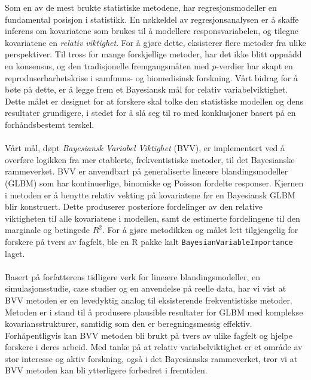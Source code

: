 Som en av de mest brukte statistiske metodene, har regresjonsmodeller en fundamental posisjon i statistikk. En nøkkeldel av regresjonsanalysen er å skaffe inferens om kovariatene som brukes til å modellere responsvariabelen, og tilegne kovariatene en \textit{relativ viktighet}. For å gjøre dette, eksisterer flere metoder fra ulike perspektiver. Til tross for mange forskjellige metoder, har det ikke blitt oppnådd en konsensus, og den tradisjonelle fremgangsmåten med $p$-verdier har skapt en reproduserbarhetskrise i samfunns- og biomedisinsk forskning. Vårt bidrag for å bøte på dette, er å legge frem et Bayesiansk mål for relativ variabelviktighet. Dette målet er designet for at forskere skal tolke den statistiske modellen og dens resultater grundigere, i stedet for å slå seg til ro med konklusjoner basert på en forhåndsbestemt terskel.
\\
\\
Vårt mål, døpt \textit{Bayesiansk Variabel Viktighet} (BVV), er implementert ved å overføre logikken fra mer etablerte, frekventistiske metoder, til det Bayesianske rammeverket. BVV er anvendbart på generaliserte lineære blandingsmodeller (GLBM) som har kontinuerlige, binomiske og Poisson fordelte responser. Kjernen i metoden er å benytte relativ vekting på kovariatene før en Bayesiansk GLBM blir konstruert. Dette produserer posteriore fordelinger av den relative viktigheten til alle kovariatene i modellen, samt de estimerte fordelingene til den marginale og betingede $R^2$. For å gjøre metodikken og målet lett tilgjengelig for forskere på tvers av fagfelt, ble en R pakke kalt \texttt{BayesianVariableImportance} laget.
\\
\\
Basert på forfatterens tidligere verk \citet{Arnstad:Relative_variable_importance_in_Bayesian_linear_mixed_models:2024} for lineære blandingsmodeller, en simulasjonsstudie, case studier og en anvendelse på reelle data, har vi vist at BVV metoden er en levedyktig analog til eksisterende frekventistiske metoder. Metoden er i stand til å produsere plausible resultater for GLBM med komplekse kovariansstrukturer, samtidig som den er beregningsmessig effektiv. Forhåpentligvis kan BVV metoden bli brukt på tvers av ulike fagfelt og hjelpe forskere i deres arbeid. Med tanke på at relativ variabelviktighet er et område av stor interesse og aktiv forskning, også i det Bayesiansks rammeverket, tror vi at BVV metoden kan bli ytterligere forbedret i fremtiden.